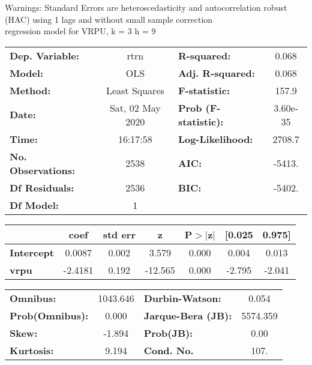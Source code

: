 Warnings: \newline
 [1] Standard Errors are heteroscedasticity and autocorrelation robust (HAC) using 1 lags and without small sample correction\\ 

regression model for VRPU, k = 3 h = 9\begin{center}
\begin{tabular}{lclc}
\toprule
\textbf{Dep. Variable:}    &       rtrn       & \textbf{  R-squared:         } &     0.068   \\
\textbf{Model:}            &       OLS        & \textbf{  Adj. R-squared:    } &     0.068   \\
\textbf{Method:}           &  Least Squares   & \textbf{  F-statistic:       } &     157.9   \\
\textbf{Date:}             & Sat, 02 May 2020 & \textbf{  Prob (F-statistic):} &  3.60e-35   \\
\textbf{Time:}             &     16:17:58     & \textbf{  Log-Likelihood:    } &    2708.7   \\
\textbf{No. Observations:} &        2538      & \textbf{  AIC:               } &    -5413.   \\
\textbf{Df Residuals:}     &        2536      & \textbf{  BIC:               } &    -5402.   \\
\textbf{Df Model:}         &           1      & \textbf{                     } &             \\
\bottomrule
\end{tabular}
\begin{tabular}{lcccccc}
                   & \textbf{coef} & \textbf{std err} & \textbf{z} & \textbf{P$> |$z$|$} & \textbf{[0.025} & \textbf{0.975]}  \\
\midrule
\textbf{Intercept} &       0.0087  &        0.002     &     3.579  &         0.000        &        0.004    &        0.013     \\
\textbf{vrpu}      &      -2.4181  &        0.192     &   -12.565  &         0.000        &       -2.795    &       -2.041     \\
\bottomrule
\end{tabular}
\begin{tabular}{lclc}
\textbf{Omnibus:}       & 1043.646 & \textbf{  Durbin-Watson:     } &    0.054  \\
\textbf{Prob(Omnibus):} &   0.000  & \textbf{  Jarque-Bera (JB):  } & 5574.359  \\
\textbf{Skew:}          &  -1.894  & \textbf{  Prob(JB):          } &     0.00  \\
\textbf{Kurtosis:}      &   9.194  & \textbf{  Cond. No.          } &     107.  \\
\bottomrule
\end{tabular}
\end{center}

